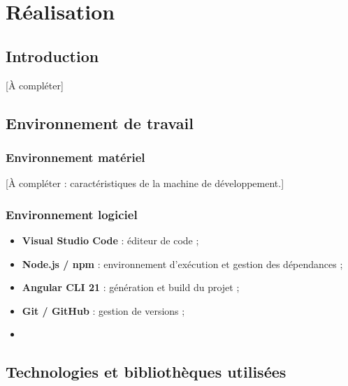 \chapter{R\'ealisation}
\label{chap:realisation}

\section{Introduction}

[\`A compl\'eter]

\section{Environnement de travail}

\subsection{Environnement mat\'eriel}
[\`A compl\'eter : caract\'eristiques de la machine de d\'eveloppement.]

\subsection{Environnement logiciel}

\begin{itemize}
    \item \textbf{Visual Studio Code} : \'editeur de code ;
    \item \textbf{Node.js / npm} : environnement d'ex\'ecution et gestion
    des d\'ependances ;
    \item \textbf{Angular CLI 21} : g\'en\'eration et build du projet ;
    \item \textbf{Git / GitHub} : gestion de versions ;
    \item [\`A compl\'eter : Postman, Docker, IDE backend, etc.]
\end{itemize}

\section{Technologies et biblioth\`eques utilis\'ees}

